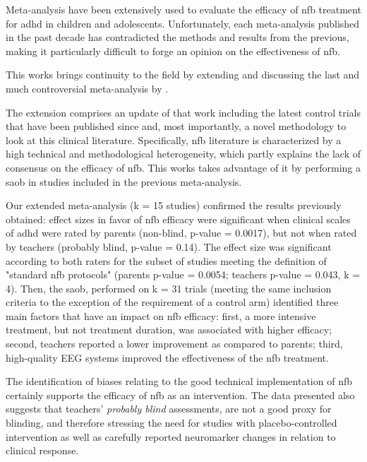 

\noindent Meta-analysis have been extensively used to
evaluate the efficacy of \gls{nfb} treatment for \gls{adhd} in children and adolescents. 
Unfortunately, each meta-analysis published in the past decade has contradicted the methods and
results from the previous, making it particularly difficult to forge an opinion
on the effectiveness of \gls{nfb}. 

This works brings continuity to the field by extending and discussing the last and much 
controversial meta-analysis by \citet{Cortese2016}. 


The extension comprises an update of that work including the latest control trials 
that have been published since and, most importantly, a
novel methodology to look at this clinical literature. Specifically, \gls{nfb} literature is characterized 
by a high technical and methodological heterogeneity, which partly explains the lack of consensus on 
the efficacy of \gls{nfb}. This works takes advantage of it by performing a \gls{saob} in studies included in the previous meta-analysis.

Our extended meta-analysis (k = 15 studies) confirmed the results previously
obtained: effect sizes in favor of \gls{nfb} efficacy were significant when clinical scales of \gls{adhd}
were rated by parents (non-blind, p-value = 0.0017), but not when rated by
teachers (probably blind, p-value = 0.14). The effect size was significant
according to both raters for the subset of studies meeting the definition of
"standard \gls{nfb} protocols" (parents p-value = 0.0054; teachers p-value = 0.043, k
= 4). Then, the \gls{saob}, performed on k = 31 trials (meeting the same inclusion
criteria to the exception of the requirement of a control arm)
identified three main factors that have an impact on \gls{nfb} efficacy: first, a more
intensive treatment, but not treatment duration, was associated with higher
efficacy; second, teachers reported a lower improvement as compared to parents;
third, high-quality EEG systems improved the effectiveness of the \gls{nfb} treatment.


The identification of biases relating to the good technical implementation of \gls{nfb} 
certainly supports the efficacy of \gls{nfb} as an
intervention. The data presented also suggests that teachers' \emph{probably blind} assessments, are
not a good proxy for blinding, 
and therefore stressing the need for studies with placebo-controlled
intervention as well as carefully reported neuromarker changes in relation to
clinical response. 



